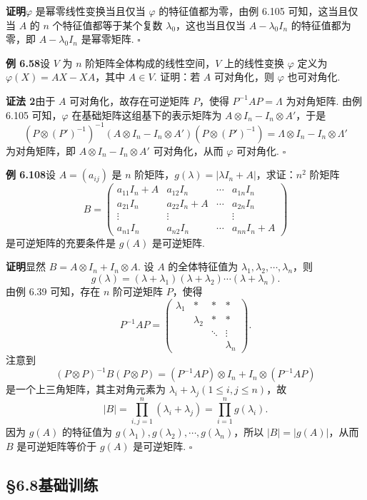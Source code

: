 \documentclass[UTF8, 12pt, fontset=fandol, oneside]{ctexart}
\begin{document}
\noindent\textbf{证明}\quad $\varphi$ 是幂零线性变换当且仅当 $\varphi$ 的特征值都为零，由例 6.105 可知，这当且仅当 $A$ 的 $n$ 个特征值都等于某个复数 $\lambda_0$，这也当且仅当 $A-\lambda_0I_n$ 的特征值都为零，即 $A-\lambda_0I_n$ 是幂零矩阵. $\square$

\noindent\textbf{例 6.58}\quad 设 $V$ 为 $n$ 阶矩阵全体构成的线性空间，$V$ 上的线性变换 $\varphi$ 定义为 $\varphi(X)=AX-XA$，其中 $A\in V$. 证明：若 $A$ 可对角化，则 $\varphi$ 也可对角化.

\noindent\textbf{证法 2}\quad 由于 $A$ 可对角化，故存在可逆矩阵 $P$，使得 $P^{-1}AP=\Lambda$ 为对角矩阵. 由例 6.105 可知，$\varphi$ 在基础矩阵这组基下的表示矩阵为 $A\otimes I_n-I_n\otimes A'$，于是
\[
(P\otimes(P')^{-1})^{-1}(A\otimes I_n-I_n\otimes A')(P\otimes(P')^{-1})=\Lambda\otimes I_n-I_n\otimes\Lambda'
\]
为对角矩阵，即 $A\otimes I_n-I_n\otimes A'$ 可对角化，从而 $\varphi$ 可对角化. $\square$

\noindent\textbf{例 6.108}\quad 设 $A=(a_{ij})$ 是 $n$ 阶矩阵，$g(\lambda)=|\lambda I_n+A|$，求证：$n^2$ 阶矩阵
\[
B=
\begin{pmatrix}
a_{11}I_n+A&a_{12}I_n&\cdots&a_{1n}I_n\\
a_{21}I_n&a_{22}I_n+A&\cdots&a_{2n}I_n\\
\vdots&\vdots&&\vdots\\
a_{n1}I_n&a_{n2}I_n&\cdots&a_{nn}I_n+A
\end{pmatrix}
\]
是可逆矩阵的充要条件是 $g(A)$ 是可逆矩阵.

\noindent\textbf{证明}\quad 显然 $B=A\otimes I_n+I_n\otimes A$. 设 $A$ 的全体特征值为 $\lambda_1,\lambda_2,\cdots,\lambda_n$，则
\[
g(\lambda)=(\lambda+\lambda_1)(\lambda+\lambda_2)\cdots(\lambda+\lambda_n).
\]
由例 6.39 可知，存在 $n$ 阶可逆矩阵 $P$，使得
\[
P^{-1}AP=
\begin{pmatrix}
\lambda_1&*&*&*\\
&\lambda_2&*&*\\
&&\ddots&\vdots\\
&&&\lambda_n
\end{pmatrix}.
\]
注意到
\[
(P\otimes P)^{-1}B(P\otimes P)=(P^{-1}AP)\otimes I_n+I_n\otimes(P^{-1}AP)
\]
是一个上三角矩阵，其主对角元素为 $\lambda_i+\lambda_j(1\le i,j\le n)$，故
\[
|B|=\prod_{i,j=1}^n(\lambda_i+\lambda_j)=\prod_{i=1}^n g(\lambda_i).
\]
因为 $g(A)$ 的特征值为 $g(\lambda_1),g(\lambda_2),\cdots,g(\lambda_n)$，所以 $|B|=|g(A)|$，从而 $B$ 是可逆矩阵等价于 $g(A)$ 是可逆矩阵. $\square$

\subsection*{§6.8\quad 基础训练}
\end{document}
